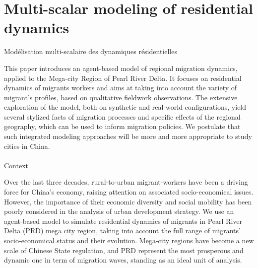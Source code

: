

\newpage

\section{Multi-scalar modeling of residential dynamics}{Modélisation multi-scalaire des dynamiques résidentielles} %

\label{app:sec:migrationdynamics} %









This paper introduces an agent-based model of regional migration dynamics, applied to the Mega-city Region of Pearl River Delta. It focuses on residential dynamics of migrants workers and aims at taking into account the variety of migrant's profiles, based on qualitative fieldwork observations. The extensive exploration of the model, both on synthetic and real-world configurations, yield several stylized facts of migration processes and specific effects of the regional geography, which can be used to inform migration policies. We postulate that such integrated modeling approaches will be more and more appropriate to study cities in China.




\paragraph{}{Context}

Over the last three decades, rural-to-urban migrant-workers have been a driving force for China's economy, raising attention on associated socio-economical issues. However, the importance of their economic diversity and social mobility has been poorly considered in the analysis of urban development strategy.
We use an agent-based model to simulate residential dynamics of migrants in Pearl River Delta (PRD) mega city region, taking into account the full range of migrants’ socio-economical status and their evolution. Mega-city regions have become a new scale of Chinese State regulation, and PRD represent the most prosperous and dynamic one in term of migration waves, standing as an ideal unit of analysis.

